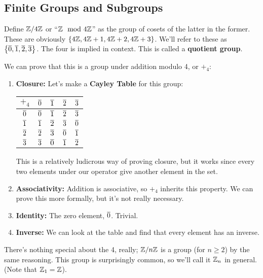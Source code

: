 \label{31-0423}
\subsection{Finite Groups and Subgroups}
Define $\mathbb{Z}/4\mathbb{Z}$ or ``$\mathbb{Z} \mod 4\mathbb{Z}$'' as the group of cosets of the latter in the former.
These are obviously $\left\{4\mathbb{Z}, 4\mathbb{Z} + 1, 4 \mathbb{Z} + 2, 4\mathbb{Z}+3\right\}$. We'll refer to these as 
$\left\{\overline 0, \overline 1, \overline 2, \overline 3\right\}$. The four is implied in context. 
This is called a \textbf{quotient group}. 

We can prove that this is a group under addition modulo 4, or $+_4$: 

\begin{enumerate}
    \item \textbf{Closure:} Let's make a \textbf{Cayley Table} for this group: 
    \begin{center}
        \begin{tabular}{|c|c|c|c|c|}
            \hline 
            $+_4$ & $\overline{0}$ & $\overline{1}$ & $\overline{2}$ & $\overline{3}$ \\ \hline 
            $\overline{0}$ & $\overline{0}$ & $\overline{1}$ & $\overline{2}$ & $\overline{3}$ \\ \hline 
            $\overline{1}$ & $\overline{1}$ & $\overline{2}$ & $\overline{3}$ & $\overline{0}$ \\ \hline 
            $\overline{2}$ & $\overline{2}$ & $\overline{3}$ & $\overline{0}$ & $\overline{1}$ \\ \hline 
            $\overline{3}$ & $\overline{3}$ & $\overline{0}$ & $\overline{1}$ & $\overline{2}$ \\ \hline 
        \end{tabular}
    \end{center}
    This is a relatively ludicrous way of proving closure, but it works
since every two elements under our operator give another element
in the set.
    \item \textbf{Associativity:} Addition is associative, so $+_4$ inherits this 
    property. We can prove this more formally, but it's not really necessary. 
    \item \textbf{Identity:} The zero element, $\overline{0}$. Trivial. 
    \item \textbf{Inverse:} We can look at the table and ﬁnd that every element has an
    inverse.    
\end{enumerate}
There's nothing special about the 4, really; $\mathbb{Z} / n \mathbb{Z}$ is a group (for $n \geq 2$) by
the same reasoning. This group is surprisingly common, so we'll call it $\mathbb{Z}_n$
in general. (Note that $\mathbb{Z}_1 = \mathbb{Z}$).\\

